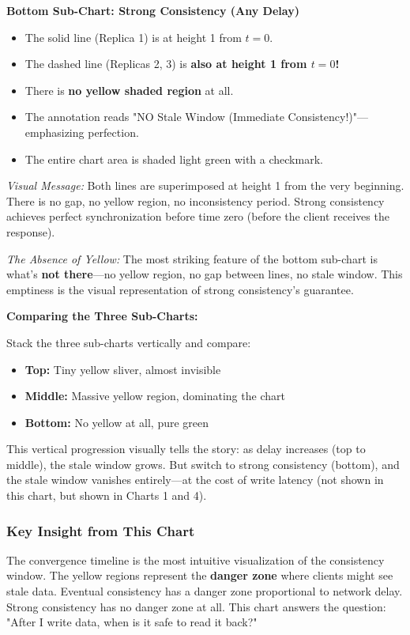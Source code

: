 \documentclass[10pt,a4paper]{article}
\begin{document}
\textbf{Bottom Sub-Chart: Strong Consistency (Any Delay)}

\begin{itemize}
    \item The solid line (Replica 1) is at height 1 from $t=0$.
    \item The dashed line (Replicas 2, 3) is \textbf{also at height 1 from $t=0$!}
    \item There is \textbf{no yellow shaded region} at all.
    \item The annotation reads "NO Stale Window (Immediate Consistency!)"---emphasizing perfection.
    \item The entire chart area is shaded light green with a checkmark.
\end{itemize}

\textit{Visual Message:} Both lines are superimposed at height 1 from the very beginning. There is no gap, no yellow region, no inconsistency period. Strong consistency achieves perfect synchronization before time zero (before the client receives the response).

\textit{The Absence of Yellow:} The most striking feature of the bottom sub-chart is what's \textbf{not there}---no yellow region, no gap between lines, no stale window. This emptiness is the visual representation of strong consistency's guarantee.

\textbf{Comparing the Three Sub-Charts:}

Stack the three sub-charts vertically and compare:
\begin{itemize}
    \item \textbf{Top:} Tiny yellow sliver, almost invisible
    \item \textbf{Middle:} Massive yellow region, dominating the chart
    \item \textbf{Bottom:} No yellow at all, pure green
\end{itemize}

This vertical progression visually tells the story: as delay increases (top to middle), the stale window grows. But switch to strong consistency (bottom), and the stale window vanishes entirely---at the cost of write latency (not shown in this chart, but shown in Charts 1 and 4).

\subsubsection{Key Insight from This Chart}

The convergence timeline is the most intuitive visualization of the consistency window. The yellow regions represent the \textbf{danger zone} where clients might see stale data. Eventual consistency has a danger zone proportional to network delay. Strong consistency has no danger zone at all. This chart answers the question: "After I write data, when is it safe to read it back?"
\end{document}
